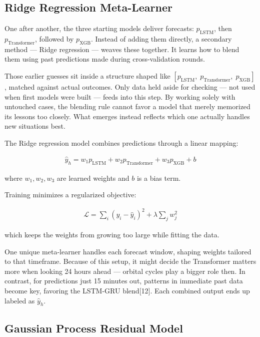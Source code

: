 \documentclass[conference]{IEEEtran}
\begin{document}
\subsection{Ridge Regression Meta-Learner}

One after another, the three starting models deliver forecasts: $p_{\text{LSTM}}$, then $p_{\text{Transformer}}$, followed by $p_{\text{XGB}}$. Instead of adding them directly, a secondary method — Ridge regression — weaves these together. It learns how to blend them using past predictions made during cross-validation rounds.

Those earlier guesses sit inside a structure shaped like $[p_{\text{LSTM}},\; p_{\text{Transformer}},\; p_{\text{XGB}}]$, matched against actual outcomes. Only data held aside for checking — not used when first models were built — feeds into this step. By working solely with untouched cases, the blending rule cannot favor a model that merely memorized its lessons too closely. What emerges instead reflects which one actually handles new situations best.

The Ridge regression model combines predictions through a linear mapping:

\begin{align}
\hat{y}_h = w_1 p_{\text{LSTM}} + w_2 p_{\text{Transformer}} + w_3 p_{\text{XGB}} + b
\end{align}

where $w_1, w_2, w_3$ are learned weights and $b$ is a bias term.

Training minimizes a regularized objective:

\begin{align}
\mathcal{L} = \sum_{i} (y_i - \hat{y}_i)^2 + \lambda \sum_{j} w_j^2
\end{align}

which keeps the weights from growing too large while fitting the data.

One unique meta-learner handles each forecast window, shaping weights tailored to that timeframe. Because of this setup, it might decide the Transformer matters more when looking 24 hours ahead — orbital cycles play a bigger role then. In contrast, for predictions just 15 minutes out, patterns in immediate past data become key, favoring the LSTM-GRU blend[12]. Each combined output ends up labeled as $\hat{y}_h$.

\subsection{Gaussian Process Residual Model}
\end{document}
